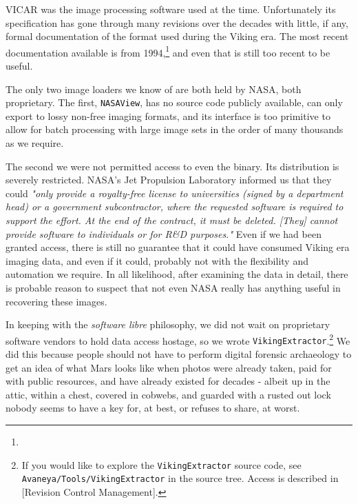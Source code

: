 VICAR was the image processing software used at the time. Unfortunately its specification has gone through many revisions over the decades with little, if any, formal documentation of the format used during the Viking era. The most recent documentation available is from 1994,\footnote{} and even that is still too recent to be useful.

The only two image loaders we know of are both held by NASA, both proprietary. The first, {\tt NASAView}, has no source code publicly available, can only export to lossy non-free imaging formats, and its interface is too primitive to allow for batch processing with large image sets in the order of many thousands as we require.

The second we were not permitted access to even the binary. Its distribution is severely restricted. NASA's Jet Propulsion Laboratory informed us that they could {\it "only provide a royalty-free license to universities (signed by a department head) or a government subcontractor, where the requested software is required to support the effort. At the end of the contract, it must be deleted. [They] cannot provide software to individuals or for R&D purposes."} Even if we had been granted access, there is still no guarantee that it could have consumed Viking era imaging data, and even if it could, probably not with the flexibility and automation we require. In all likelihood, after examining the data in detail, there is probable reason to suspect that not even NASA really has anything useful in recovering these images.


In keeping with the {\it software libre} philosophy, we did not wait on proprietary software vendors to hold data access hostage, so we wrote {\tt VikingExtractor}.\footnote{If you would like to explore the {\tt VikingExtractor} source code, see {\tt Avaneya/Tools/VikingExtractor} in the source tree. Access is described in [Revision Control Management].} We did this because people should not have to perform digital forensic archaeology to get an idea of what Mars looks like when photos were already taken, paid for with public resources, and have already existed for decades - albeit up in the attic, within a chest, covered in cobwebs, and guarded with a rusted out lock nobody seems to have a key for, at best, or refuses to share, at worst.

    {}

